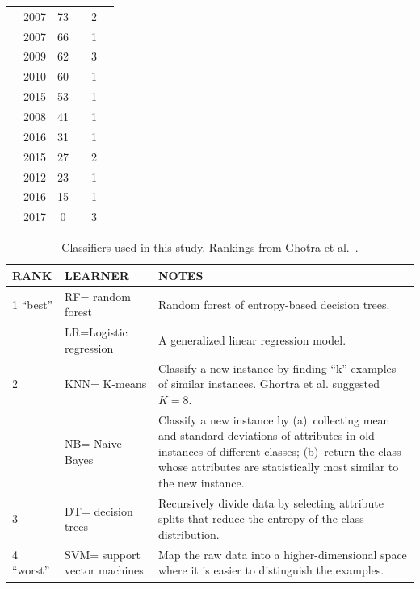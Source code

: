 \documentclass[sigconf,review, anonymous]{acmart}
\newcommand{\cmark}{\ding{51}}%
\newcommand{\xmark}{\ding{55}}%
\theoremstyle{break}
\theoremstyle{break}
\begin{document}
\begin{table}[!b]
\begin{tabular}{c|c|c|c|c|c}
        \cite{kamei2007effects} & 2007 & 73 & \xmark & 2 & \cmark\\  
        \cite{pelayo2007applying} & 2007 & 66 & \xmark & 1 & \cmark \\  
        \cite{jiang2009variance} & 2009 & 62 & \cmark & 3 & \xmark  \\ 
        \cite{khoshgoftaar2010attribute} & 2010 & 60 & \cmark & 1 & \cmark  \\  
        \cite{ghotra2015revisiting} & 2015 & 53 & \cmark & 1 & \xmark  \\  
        \cite{jiang2008can} & 2008 & 41 & \cmark & 1 & \xmark  \\  
         \cite{tantithamthavorn2016automated} & 2016 & 31 & \cmark & 1 & \xmark  \\ 
        \cite{tan2015online} & 2015 & 27 & \xmark & 2 & \cmark \\  
        \cite{pelayo2012evaluating} & 2012 & 23 & \xmark & 1 & \cmark \\  
        \cite{fu2016tuning} & 2016 & 15 & \cmark & 1 & \xmark  \\  
        \cite{bennin2017mahakil} & 2017 & 0 & \cmark & 3 & \cmark \\
\end{tabular}
\vspace{-0.3cm}
\end{table}

 \begin{table}[!t]
 \caption{Classifiers used in this study.
 Rankings
 from Ghotra et al.~\cite{ghotra2015revisiting}.}
 \vspace{-0.2cm}
 \label{tbl:learners}
 \footnotesize
 \begin{tabular}{l|l|p{4.5in}}
{\bf RANK} & {\bf LEARNER} & {\bf NOTES}\\\hline
 1 ``best'' & RF= random forest & 
 Random forest of entropy-based decision trees.\\\cline{2-3}
 &  LR=Logistic regression &
 A generalized linear regression
model.\\\hline
 2 & KNN= K-means &  Classify a new instance by finding ``k'' examples of similar instances.
 Ghortra et al. suggested
 $K=8$.\\\cline{2-3}
 & NB= Naive Bayes &  Classify a new instance by (a)~collecting mean and standard deviations of attributes in old instances of  different classes; (b)~return the class whose attributes are statistically most similar to the new instance.\\\hline
 3 & DT= decision trees & Recursively
 divide data by selecting attribute splits
 that reduce the entropy of the class distribution.\\\hline

 4 ``worst'' & SVM= support vector machines &
 Map the raw data into a higher-dimensional space where it is easier to distinguish the examples.
 \\\hline
 \end{tabular}
 \vspace{-0.2cm}
 \end{table}
 
\end{document}
